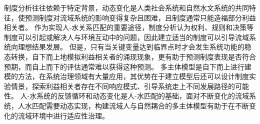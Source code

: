 制度分析往往依赖于特定背景，动态变化是人类社会系统和自然水文系统的共同特征，使预测制度对流域系统的影响变得复杂且困难，且制度通常只能造福部分利益相关者。
作为实现人-水关系匹配的重要途径，制度分析认为权利、规则和决策等制度可以引起或解决人与环境互动中的问题，因此建立适当的制度可以引导流域系统向理想结果发展。  %
但是，只有当关键变量达到临界点时才会发生系统功能的稳态转换，自下而上地模拟利益相关者的涌现现象，更有助于预测制度表现是否符合预期，而自上而下的评估通常难以获得这种预测。
多主体模型是自下而上进行建模的方法，在系统治理领域有大量应用，其优势在于建立模型后还可以设计制度实验情景，探索利益相关者存在不同响应模式、引导系统走上不同发展路径的可能性。
人-水系统的反馈循环和动态变化是人-水匹配的基础，面对不断变化的流域系统，人水匹配需要动态实现，构建流域人与自然耦合的多主体模型有助于在不断变化的流域环境中进行适应性治理。



